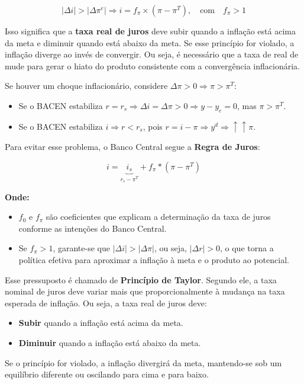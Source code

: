 \documentclass[a4paper,12pt]{article}[abntex2]
\begin{document}
\[
|\Delta i| > |\Delta \pi^e| \Rightarrow i = f_\pi \times (\pi - \pi^T), \quad \text{com} \quad f_\pi > 1
\]

Isso significa que a \textbf{taxa real de juros} deve subir quando a inflação está acima da meta e diminuir quando está abaixo da meta.  
Se esse princípio for violado, a inflação diverge ao invés de convergir. Ou seja, é  necessário que a taxa de real de mude para gerar o hiato do produto consistente com a convergência inflacionária.

Se houver um choque inflacionário, considere \( \Delta \pi > 0 \Rightarrow \pi > \pi^T \):

\begin{itemize}
    \item Se o BACEN estabiliza \( r = r_s \Rightarrow \Delta i = \Delta \pi > 0 \Rightarrow y - y_e = 0 \), mas \( \pi > \pi^T \).
    \item Se o BACEN estabiliza \( i \Rightarrow r < r_s \), pois \( r = i - \pi \Rightarrow y^d \Rightarrow \uparrow \uparrow \pi \).
\end{itemize}

Para evitar esse problema, o Banco Central segue a \textbf{Regra de Juros}:

\[
i = \underbrace{i_s}_{r_s-\pi^T} + f_\pi * (\pi - \pi^T)
\]

\textbf{Onde:}\begin{itemize}
    \item \( f_0 \) e \( f_\pi \) são coeficientes que explicam a determinação da taxa de juros conforme as intenções do Banco Central.
    \item Se \( f_\pi > 1 \), garante-se que \( |\Delta i| > |\Delta \pi| \), ou seja, \( |\Delta r| > 0 \), o que torna a política efetiva para aproximar a inflação à meta e o produto ao potencial.
\end{itemize}

Esse pressuposto é chamado de \textbf{Princípio de Taylor}. Segundo ele, a taxa nominal de juros deve variar mais que proporcionalmente à mudança na taxa esperada de inflação.  
Ou seja, a taxa real de juros deve:\begin{itemize}
    \item \textbf{Subir} quando a inflação está acima da meta.
    \item \textbf{Diminuir} quando a inflação está abaixo da meta.
\end{itemize}

Se o princípio for violado, a inflação divergirá da meta, mantendo-se sob um equilíbrio diferente ou oscilando para cima e para baixo.
\end{document}
